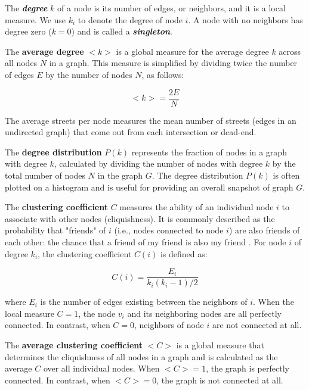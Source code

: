 The \textbf{\textit{degree}} $k$ of a node is its number of edges, or neighbors, and it is a local measure. We use $k_i$ to denote the degree of node $i$. A node with no neighbors has degree zero ($k = 0$) and is called a \textbf{\textit{singleton}}.

The \textbf{average degree} $<k>$ is a global measure for the average degree $k$ across all nodes $N$ in a graph. This measure is simplified by dividing twice the number of edges $E$ by the number of nodes $N$, as follows:

\begin{equation} \label{eq:1}
<k> = \frac{2E}{N}
\end{equation}

The average streets per node measures the mean number of streets (edges in an undirected graph) that come out from each intersection or dead-end.

The \textbf{degree distribution} $P(k)$ represents the fraction of nodes in a graph with degree $k$, calculated by dividing the number of nodes with degree $k$ by the total number of nodes $N$ in the graph $G$. The degree distribution $P(k)$ is often plotted on a histogram and is useful for providing an overall snapshot of graph $G$.

The \textbf{clustering coefficient} $C$ measures the ability of an individual node $i$ to associate with other nodes (cliquishness). It is commonly described as the probability that "friends" of $i$ (i.e., nodes connected to node $i$) are also friends of each other: the chance that a friend of my friend is also my friend \cite{watts_strogatz_1998}. For node $i$ of degree $k_i$, the clustering coefficient $C(i)$ is defined as:

\begin{equation} \label{eq:2}
	C(i) = \frac{E_i}{k_i(k_i - 1)/2}
\end{equation}

where $E_i$ is the number of edges existing between the neighbors of $i$. When the local measure $C = 1$, the node $v_i$ and its neighboring nodes are all perfectly connected. In contrast, when $C = 0$, neighbors of node $i$ are not connected at all.

The \textbf{average clustering coefficient} $<C>$ is a global measure that determines the cliquishness of all nodes in a graph and is calculated as the average $C$ over all individual nodes. When $<C> = 1$, the graph is perfectly connected. In contrast, when $<C> = 0$, the graph is not connected at all.

